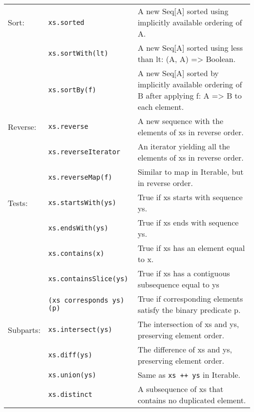 \documentclass[article, a5paper]{memoir}
\begin{document}
{\begin{tabular}{@{}l p{3.75cm} p{6.8cm}}
  Sort: & \texttt{xs.sorted} & A new Seq[A] sorted using implicitly available ordering of A. \\   \cline{2-3}
   & \texttt{xs.sortWith(lt)} &  	A new Seq[A] sorted using less than lt: (A, A) => Boolean.\\\cline{2-3}
   & \texttt{xs.sortBy(f)}   &  	A new Seq[A] sorted by implicitly available ordering of B after applying f: A => B to each element.\\ \cline{1-3}


Reverse: & \texttt{xs.reverse} & A new sequence with the elements of xs in reverse order. \\   \cline{2-3}
   & \texttt{xs.reverseIterator} & An iterator yielding all the elements of xs in reverse order.\\\cline{2-3}
   & \texttt{xs.reverseMap(f)} & Similar to map in Iterable, but in reverse order.\\\cline{1-3}


  Tests: & \texttt{xs.startsWith(ys)} & True if xs starts with sequence ys. \\   \cline{2-3}
   & \texttt{xs.endsWith(ys)} & True if xs ends with sequence ys.\\\cline{2-3}
   & \texttt{xs.contains(x)} & True if xs has an element equal to x.\\\cline{2-3}
   & \texttt{xs.containsSlice(ys)} & True if xs has a contiguous subsequence equal to ys\\\cline{2-3}
   & \texttt{(xs corresponds ys)(p)} & True if corresponding elements satisfy the binary predicate p.\\\cline{1-3}

  Subparts: & \texttt{xs.intersect(ys)} & The intersection of xs and ys, preserving element order.\\\cline{2-3}
   & \texttt{xs.diff(ys)} & The difference of xs and ys, preserving element order.\\\cline{2-3}
   & \texttt{xs.union(ys)} & Same as \texttt{xs ++ ys} in Iterable.\\\cline{2-3}
   & \texttt{xs.distinct} & A subsequence of xs that contains no duplicated element.\\\cline{1-3}



\end{tabular}
}
\end{document}
